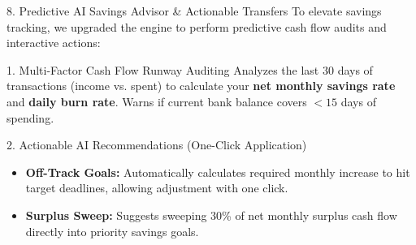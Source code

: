 \documentclass[10pt,aspectratio=169]{beamer}
\begin{document}
\begin{frame}{8. Predictive AI Savings Advisor \& Actionable Transfers}
    To elevate savings tracking, we upgraded the engine to perform predictive cash flow audits and interactive actions:
    
    \begin{block}{1. Multi-Factor Cash Flow Runway Auditing}
        Analyzes the last 30 days of transactions (income vs. spent) to calculate your \textbf{net monthly savings rate} and \textbf{daily burn rate}.
        Warns if current bank balance covers $<15$ days of spending.
    \end{block}

    \begin{block}{2. Actionable AI Recommendations (One-Click Application)}
        \begin{itemize}
            \item \textbf{Off-Track Goals:} Automatically calculates required monthly increase to hit target deadlines, allowing adjustment with one click.
            \item \textbf{Surplus Sweep:} Suggests sweeping 30\% of net monthly surplus cash flow directly into priority savings goals.
        \end{itemize}
    \end{block}
\end{frame}
\end{document}
